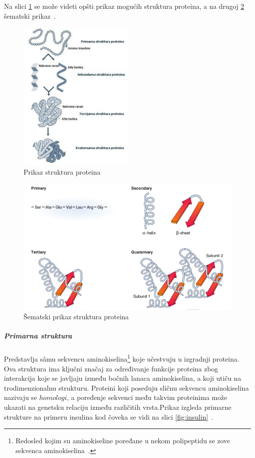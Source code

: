 Na slici \ref{fig:structures} se može videti opšti prikaz mogućih struktura proteina, a na drugoj \ref{fig:structures2} šematski prikaz~\cite{spasic}.
\begin{figure}[h]
	\centering
    \includegraphics[width=0.5\textwidth]{Figures/BO/protein_structures.png}
    \caption{Prikaz struktura proteina}
    \label{fig:structures}
\end{figure}
\begin{figure}[h]
	\centering
    \includegraphics[width=1\textwidth]{Figures/BO/structure_schema.png}
    \caption{Šematski prikaz struktura proteina~\cite{bmbg}}
    \label{fig:structures2}
\end{figure}
\subparagraph{Primarna struktura}
Predstavlja s\^amu sekvencu aminokiselina\footnote{Redosled kojim su aminokiseline poređane u nekom polipeptidu se zove sekvenca aminokiselina~\cite{spasic}.} koje učestvuju u izgradnji proteina. Ova struktura ima ključni značaj za određivanje funkcije proteina zbog interakcija koje se javljaju između bočnih lanaca aminokiselina, a koji utiču na trodimenzionalnu strukturu. Proteini koji poseduju sličnu sekvencu aminokiselina nazivaju se $homologi$, a poređenje sekvenci među takvim proteinima može ukazati na genetsku relaciju između različitih vrsta.Prikaz izgleda primarne strukture na primeru insulina kod čoveka se vidi na slici \ref{fig:insulin}~\cite{spasic}.\\
